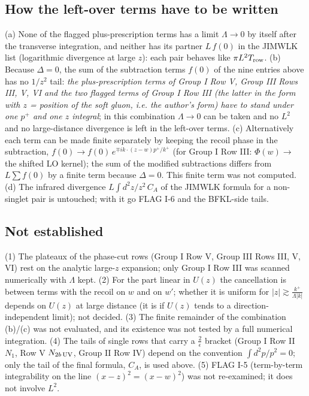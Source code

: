 \documentclass[9pt]{article}
\numberwithin{equation}{section}
\begin{document}
\subsection{How the left-over terms have to be written}
\noindent (a) None of the flagged plus-prescription terms has a limit $\Lambda\to0$ by itself after the transverse integration, and neither has its partner $L\,f(0)$ in the JIMWLK list (logarithmic divergence at large $z$): each pair behaves like $\pi L^{2}T_{\rm row}$. (b) Because $\Delta=0$, the sum of the subtraction terms $f(0)$ of the nine entries above has no $1/z^{2}$ tail: \emph{the plus-prescription terms of Group I Row V, Group III Rows III, V, VI and the two flagged terms of Group I Row III (the latter in the form with $z$ = position of the soft gluon, i.e. the author's form) have to stand under one $p^{+}$ and one $z$ integral}; in this combination $\Lambda\to0$ can be taken and no $L^{2}$ and no large-distance divergence is left in the left-over terms. (c) Alternatively each term can be made finite separately by keeping the recoil phase in the subtraction, $f(0)\to f(0)\,e^{\mp ik\cdot(z-w)p^{+}/k^{+}}$ (for Group I Row III: $\Phi(w)\to$ the shifted LO kernel); the sum of the modified subtractions differs from $L\sum f(0)$ by a finite term because $\Delta=0$. This finite term was not computed. (d) The infrared divergence $L\int d^{2}z/z^{2}\,C_{A}$ of the JIMWLK formula for a non-singlet pair is untouched; with it go FLAG I-6 and the BFKL-side tails.

\subsection{Not established}
\noindent (1) The plateaux of the phase-cut rows (Group I Row V, Group III Rows III, V, VI) rest on the analytic large-$z$ expansion; only Group I Row III was scanned numerically with $\Lambda$ kept. (2) For the part linear in $U(z)$ the cancellation is between terms with the recoil on $w$ and on $w'$; whether it is uniform for $|z|\gtrsim\frac{k^{+}}{\Lambda|k|}$ depends on $U(z)$ at large distance (it is if $U(z)$ tends to a direction-independent limit); not decided. (3) The finite remainder of the combination (b)/(c) was not evaluated, and its existence was not tested by a full numerical integration. (4) The tails of single rows that carry a $\frac{2}{\epsilon}$ bracket (Group I Row II $N_{1}$, Row V $N_{2b\,\rm UV}$, Group II Row IV) depend on the convention $\int d^{2}p/p^{2}=0$; only the tail of the final formula, $C_{A}$, is used above. (5) FLAG I-5 (term-by-term integrability on the line $(x-z)^{2}=(x-w)^{2}$) was not re-examined; it does not involve $L^{2}$.
\end{document}
